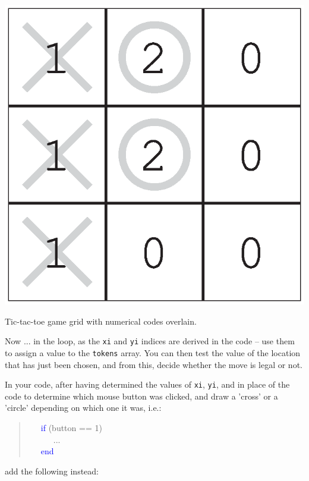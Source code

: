 \documentclass{tufte-book} %
\newenvironment{docspec}{\begin{quotation}\ttfamily\parskip0pt\parindent0pt\ignorespaces}{\end{quotation}}
\begin{document}
\begin{marginfigure}[-1.0in]
\includegraphics[width=\linewidth]{ch6-grid2.eps}
\caption{Tic-tac-toe game grid with numerical codes overlain.}
\label{fig:ch6-grid2}
\end{marginfigure}

Now ... in the loop, as the \texttt{xi} and \texttt{yi} indices are derived in the code -- use them to assign a value to the \texttt{tokens} array. You can then test  the value of the location that has just been chosen, and from this, decide whether the move is legal or not.

In your code, after having determined the values of \texttt{xi}, \texttt{yi},  and in place of  the code to determine which mouse button was clicked, and draw a 'cross' or a 'circle' depending on which one it was, i.e.:

\pagebreak

\begin{docspec}
\ \ \    \textcolor{blue}{if} (button == 1)\\
\ \ \ \ \ \  ...\\
\ \ \        \textcolor{blue}{end}
\end{docspec}
add the following instead:
\end{document}
